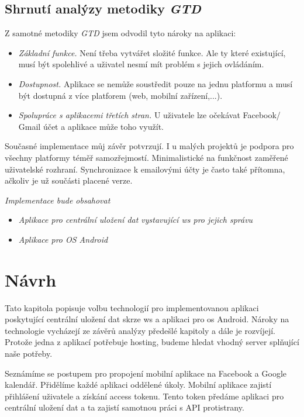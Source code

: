 \documentclass[thesis=B,czech]{FITthesis}[2012/06/26]
\newcommand{\GTD}{\textit{GTD }}
\begin{document}
\section{Shrnutí analýzy metodiky \GTD}

Z samotné metodiky \GTD jsem odvodil tyto nároky na aplikaci:
\begin{itemize}
\item \textit{Základní funkce.}
Není třeba vytvářet složité funkce. Ale ty které existující, musí být spolehlivé a uživatel nesmí mít problém s jejich ovládáním. 
\item \textit{Dostupnost.}
Aplikace se nemůže soustředit pouze na jednu platformu a musí být dostupná z více platforem (web, mobilní zařízení,...). 
\item \textit{Spolupráce s aplikacemi třetích stran.}
U uživatele lze očekávat Facebook/ Gmail účet a aplikace může toho využít.
\end{itemize}

Současné implementace můj závěr potvrzují. I u malých projektů je podpora pro všechny platformy téměř samozřejmostí. Minimalistické na funkčnost zaměřené uživatelské rozhraní. Synchronizace k emailovými účty je často také přítomna, ačkoliv je už součásti placené verze.

\textit{Implementace bude obsahovat}
\begin{itemize}
\item \textit{Aplikace pro centrální uložení dat vystavující \acrshort{ws} pro jejich správu}
\item \textit{Aplikace pro OS Android}
\end{itemize}

\chapter{Návrh}

Tato kapitola popisuje volbu technologií pro implementovanou aplikaci poskytující centrální uložení dat skrze \acrshort{ws} a aplikaci pro \acrshort{os} Android. Nároky na technologie vycházejí ze závěrů analýzy předešlé kapitoly a dále je rozvíjejí.
Protože jedna z aplikací potřebuje hosting, budeme hledat vhodný server splňující naše potřeby.

Seznámíme se postupem pro propojení mobilní aplikace na Facebook a Google kalendář. Přidělíme každé aplikaci oddělené úkoly. Mobilní aplikace zajistí přihlášení uživatele a získání access tokenu. Tento token předáme aplikaci pro centrální uložení dat a ta zajistí samotnou práci s API protistrany.
\end{document}
